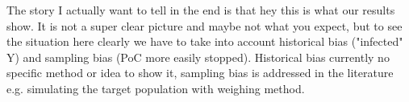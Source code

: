 The story I actually want to tell in the end is that hey this is what our results show. It is not a super clear picture and maybe not what you expect, but to see the situation here clearly we have to take into account historical bias ("infected" Y) and sampling bias (PoC more easily stopped). Historical bias currently no specific method or idea to show it, sampling bias is addressed in the literature e.g. simulating the target population with weighing method.




